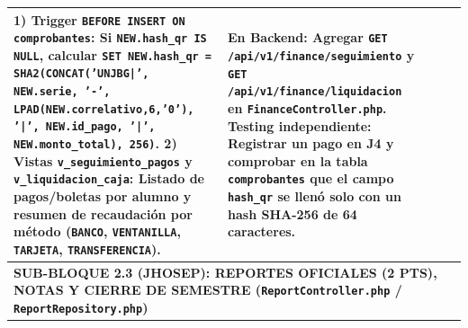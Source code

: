\documentclass[10pt,a4paper,landscape]{article}
\begin{document}
\begin{longtable}{|p{0.5cm}|p{3.8cm}|p{2.9cm}|p{8.8cm}|p{9.2cm}|}
1) \textbf{Trigger \texttt{BEFORE INSERT ON comprobantes}:} Si \texttt{NEW.hash\_qr IS NULL}, calcular \texttt{SET NEW.hash\_qr = SHA2(CONCAT('UNJBG|', NEW.serie, '-', LPAD(NEW.correlativo,6,'0'), '|', NEW.id\_pago, '|', NEW.monto\_total), 256)}.
2) \textbf{Vistas \texttt{v\_seguimiento\_pagos} y \texttt{v\_liquidacion\_caja}:} Listado de pagos/boletas por alumno y resumen de recaudación por método (\texttt{BANCO}, \texttt{VENTANILLA}, \texttt{TARJETA}, \texttt{TRANSFERENCIA}). & 
\textbf{En Backend:} Agregar \texttt{GET /api/v1/finance/seguimiento} y \texttt{GET /api/v1/finance/liquidacion} en \texttt{FinanceController.php}.\newline
\textbf{Testing independiente:} Registrar un pago en J4 y comprobar en la tabla \texttt{comprobantes} que el campo \texttt{hash\_qr} se llenó solo con un hash SHA-256 de 64 caracteres. \\
\hline

\multicolumn{5}{|l|}{\cellcolor{jhosepHeader}\textbf{\textcolor{unjbgNavy}{SUB-BLOQUE 2.3 (JHOSEP): REPORTES OFICIALES (2 PTS), NOTAS Y CIERRE DE SEMESTRE (\texttt{ReportController.php} / \texttt{ReportRepository.php})}}} \\
\hline


\end{longtable}
\end{document}
